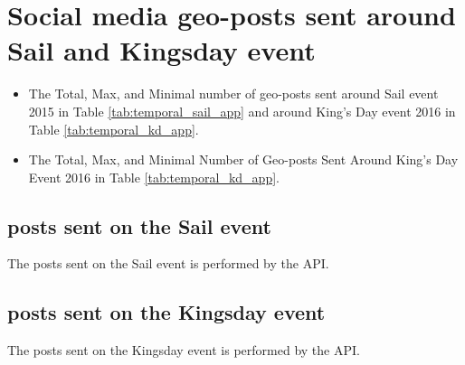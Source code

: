 
\graphicspath{{./appendix/images/}}

\section{Social media geo-posts sent around Sail and Kingsday event}

\begin{itemize}
\item The Total, Max, and Minimal number of geo-posts sent around Sail event 2015 in Table \ref{tab:temporal_sail_app} and around King's Day event 2016 in Table \ref{tab:temporal_kd_app}.
 \item The Total, Max, and Minimal Number of Geo-posts Sent Around King's Day Event 2016 in Table \ref{tab:temporal_kd_app}.
\end{itemize}

\subsection{posts sent on the Sail event}
The posts sent on the Sail event is performed by the API.

\subsection{posts sent on the Kingsday event}
The posts sent on the Kingsday event is performed by the API.


